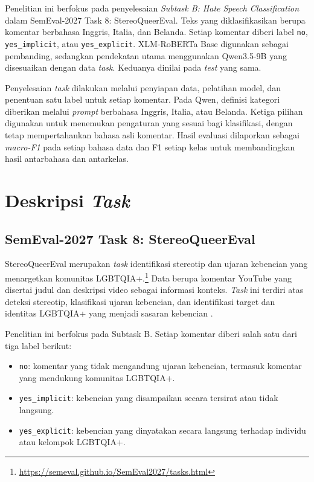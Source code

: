 \documentclass[11pt]{article}
\begin{document}
Penelitian ini berfokus pada penyelesaian \textit{Subtask B: Hate Speech Classification} dalam SemEval-2027 Task 8: StereoQueerEval. Teks yang diklasifikasikan berupa komentar berbahasa Inggris, Italia, dan Belanda. Setiap komentar diberi label \texttt{no}, \texttt{yes\_implicit}, atau \texttt{yes\_explicit}. XLM-RoBERTa Base digunakan sebagai pembanding, sedangkan pendekatan utama menggunakan Qwen3.5-9B yang disesuaikan dengan data \textit{task}. Keduanya dinilai pada \textit{test} yang sama.

Penyelesaian \textit{task} dilakukan melalui penyiapan data, pelatihan model, dan penentuan satu label untuk setiap komentar. Pada Qwen, definisi kategori diberikan melalui \textit{prompt} berbahasa Inggris, Italia, atau Belanda. Ketiga pilihan digunakan untuk menemukan pengaturan yang sesuai bagi klasifikasi, dengan tetap mempertahankan bahasa asli komentar. Hasil evaluasi dilaporkan sebagai \textit{macro-F1} pada setiap bahasa data dan F1 setiap kelas untuk membandingkan hasil antarbahasa dan antarkelas.

\section{Deskripsi \textit{Task}}
\subsection{SemEval-2027 Task 8: StereoQueerEval}
\label{sec:task}
StereoQueerEval merupakan \textit{task} identifikasi stereotip dan ujaran kebencian yang menargetkan komunitas LGBTQIA+.\footnote{\url{https://semeval.github.io/SemEval2027/tasks.html}} Data berupa komentar YouTube yang disertai judul dan deskripsi video sebagai informasi konteks. \textit{Task} ini terdiri atas deteksi stereotip, klasifikasi ujaran kebencian, dan identifikasi target dan identitas LGBTQIA+ yang menjadi sasaran kebencian \citep{stereoqueereval-2026-data}.

Penelitian ini berfokus pada Subtask B. Setiap komentar diberi salah satu dari tiga label berikut:
\begin{itemize}
    \item \texttt{no}: komentar yang tidak mengandung ujaran kebencian, termasuk komentar yang mendukung komunitas LGBTQIA+.
    \item \texttt{yes\_implicit}: kebencian yang disampaikan secara tersirat atau tidak langsung.
    \item \texttt{yes\_explicit}: kebencian yang dinyatakan secara langsung terhadap individu atau kelompok LGBTQIA+.
\end{itemize}
\end{document}
